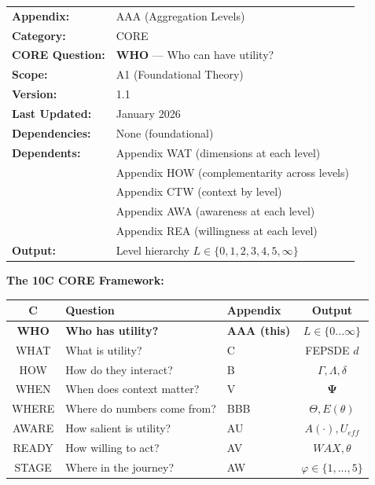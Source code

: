 \begin{tcolorbox}[colback=red!5!white, colframe=red!75!black, 
    title=\textbf{CORE Appendix: Aggregation Levels}]

\begin{tabular}{@{}ll@{}}
\textbf{Appendix:} & AAA (Aggregation Levels) \\
\textbf{Category:} & CORE \\
\textbf{CORE Question:} & \textbf{WHO} --- Who can have utility? \\
\textbf{Scope:} & A1 (Foundational Theory) \\
\textbf{Version:} & 1.1 \\
\textbf{Last Updated:} & January 2026 \\
\textbf{Dependencies:} & None (foundational) \\
\textbf{Dependents:} & Appendix WAT (dimensions at each level) \\
 & Appendix HOW (complementarity across levels) \\
 & Appendix CTW (context by level) \\
 & Appendix AWA (awareness at each level) \\
 & Appendix REA (willingness at each level) \\
\textbf{Output:} & Level hierarchy $L \in \{0, 1, 2, 3, 4, 5, \infty\}$ \\
\end{tabular}

\vspace{0.3cm}

\textbf{The 10C CORE Framework:}
\begin{center}
\small
\begin{tabular}{@{}cllc@{}}
\toprule
\textbf{C} & \textbf{Question} & \textbf{Appendix} & \textbf{Output} \\
\midrule
\textbf{WHO} & \textbf{Who has utility?} & \textbf{AAA (this)} & $L \in \{0...\infty\}$ \\
WHAT & What is utility? & C & FEPSDE $d$ \\
HOW & How do they interact? & B & $\Gamma, \Lambda, \delta$ \\
WHEN & When does context matter? & V & $\boldsymbol{\Psi}$ \\
WHERE & Where do numbers come from? & BBB & $\Theta, E(\theta)$ \\
\midrule
AWARE & How salient is utility? & AU & $A(\cdot), U_{eff}$ \\
READY & How willing to act? & AV & $WAX, \theta$ \\
STAGE & Where in the journey? & AW & $\varphi \in \{1,...,5\}$ \\
\bottomrule
\end{tabular}
\end{center}

\end{tcolorbox}

